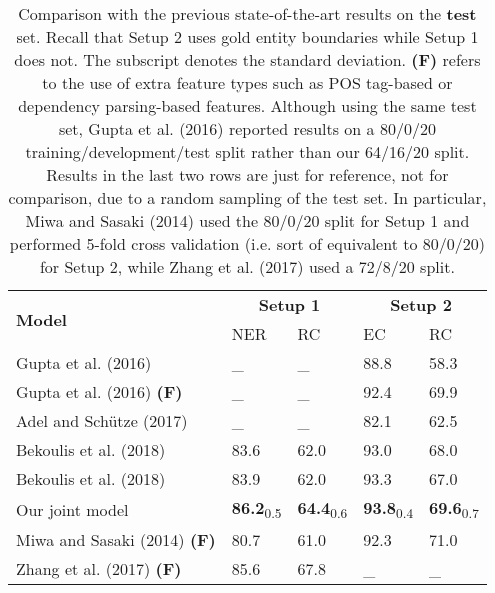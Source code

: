 \documentclass[runningheads]{llncs}
\begin{document}
\begin{table}[!t]
\centering
\setlength{\tabcolsep}{0.5em}
\caption{Comparison with the previous state-of-the-art results on the \textbf{test} set. Recall that Setup 2 uses gold entity boundaries while Setup 1 does not. The subscript denotes the standard deviation.   \textbf{(F)} refers to the use of extra feature types such as POS tag-based or  dependency parsing-based features. 
 Although using the same test set,  Gupta et al. (2016)  \cite{gupta-schutze-andrassy:2016:COLING} reported results on a 80/0/20 training/development/test split rather than our {64/16/20} split. Results in the last two rows are  just for reference, not for comparison, due to a random sampling of the  test set. In particular,  Miwa and Sasaki (2014)   \cite{miwa-sasaki:2014:EMNLP2014}  used the 80/0/20 split for Setup 1  and performed 5-fold cross validation (i.e. sort of equivalent to 80/0/20) for Setup 2, while Zhang et al. (2017)   \cite{zhang-zhang-fu:2017:EMNLP2017}  used a 72/8/20 split. }\begin{tabular}{l|ll|ll}
\hline
\multirow{2}{*}{\bf Model} & \multicolumn{2}{c|}{\bf Setup 1} & \multicolumn{2}{c}{\bf Setup 2}\\
\cline{2-5}
& NER & RC & EC & RC \\
\hline
Gupta et al. (2016) \cite{gupta-schutze-andrassy:2016:COLING} & \_ & \_ &  88.8 & 58.3  \\
Gupta et al. (2016) \cite{gupta-schutze-andrassy:2016:COLING} \textbf{(F)} & \_ & \_ &  92.4 & 69.9  \\
Adel and Sch\"utze (2017) \cite{adel-schutze:2017:EMNLP2017}& \_ & \_ & 82.1 & 62.5\\
Bekoulis et al. (2018) \cite{Bekoulis18emnlp} & 83.6 & 62.0 & 93.0 & 68.0 \\
Bekoulis et al. (2018)  \cite{BEKOULIS201834} & 83.9 & 62.0& 93.3 & 67.0 \\
\hline
Our joint model & \textbf{86.2}\textsubscript{0.5} & \textbf{64.4}\textsubscript{0.6}& \textbf{93.8}\textsubscript{0.4} & \textbf{69.6}\textsubscript{0.7} \\
\hline
Miwa and Sasaki (2014) \cite{miwa-sasaki:2014:EMNLP2014} \textbf{(F)}  & 80.7 & 61.0 & 92.3 & 71.0\\
Zhang et al. (2017) \cite{zhang-zhang-fu:2017:EMNLP2017} \textbf{(F)}& 85.6 & 67.8 & \_ & \_  \\
\hline
\end{tabular}
\label{tab:comparison}
\end{table}
\end{document}
